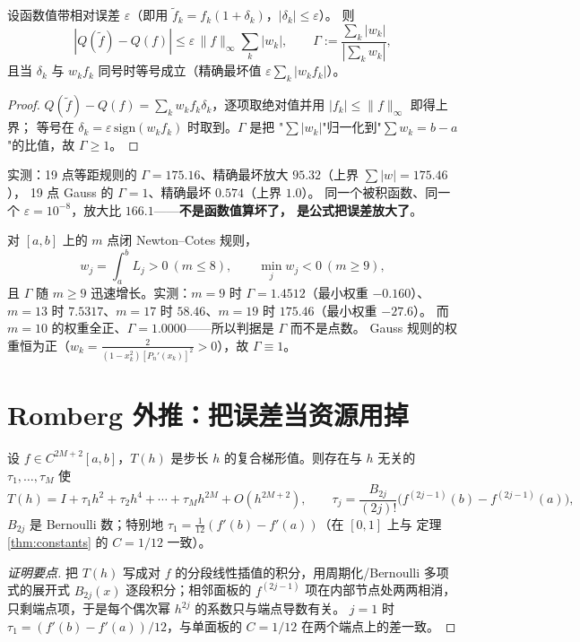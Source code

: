 \begin{theorem}
\label{thm:cond}
设函数值带相对误差 $\varepsilon$（即用 $\tilde f_k=f_k(1+\delta_k)$，$|\delta_k|\le\varepsilon$）。
则
\[
  |Q(\tilde f)-Q(f)|\le\varepsilon\,\|f\|_\infty\sum_k|w_k|,
  \qquad
  \Gamma:=\frac{\sum_k|w_k|}{|\sum_kw_k|},
\]
且当 $\delta_k$ 与 $w_kf_k$ 同号时等号成立（精确最坏值 $\varepsilon\sum_k|w_kf_k|$）。
\end{theorem}

\begin{proof}
$Q(\tilde f)-Q(f)=\sum_kw_kf_k\delta_k$，逐项取绝对值并用 $|f_k|\le\|f\|_\infty$ 即得上界；
等号在 $\delta_k=\varepsilon\,\mathrm{sign}(w_kf_k)$ 时取到。$\Gamma$ 是把
"$\sum|w_k|$"归一化到"$\sum w_k=b-a$"的比值，故 $\Gamma\ge1$。
\end{proof}

实测：19 点等距规则的 $\Gamma=175.16$、精确最坏放大 $95.32$（上界 $\sum|w|=175.46$），
19 点 Gauss 的 $\Gamma=1$、精确最坏 $0.574$（上界 $1.0$）。
同一个被积函数、同一个 $\varepsilon=10^{-8}$，放大比 $166.1$——\textbf{不是函数值算坏了，
是公式把误差放大了}。

\begin{corollary}[负权重]
对 $[a,b]$ 上的 $m$ 点闭 Newton–Cotes 规则，
\[
  w_j=\int_a^bL_j>0\ (m\le8),\qquad \min_jw_j<0\ (m\ge9),
\]
且 $\Gamma$ 随 $m\ge9$ 迅速增长。实测：$m=9$ 时 $\Gamma=1.4512$（最小权重 $-0.160$）、
$m=13$ 时 $7.5317$、$m=17$ 时 $58.46$、$m=19$ 时 $175.46$（最小权重 $-27.6$）。
而 $m=10$ 的权重全正、$\Gamma=1.0000$——所以判据是 $\Gamma$ 而不是点数。
Gauss 规则的权重恒为正（$w_k=\frac{2}{(1-x_k^2)[P_n'(x_k)]^2}>0$），故 $\Gamma\equiv1$。
\end{corollary}

\section{Romberg 外推：把误差当资源用掉}

\begin{theorem}
\label{thm:em}
设 $f\in C^{2M+2}[a,b]$，$T(h)$ 是步长 $h$ 的复合梯形值。则存在与 $h$ 无关的
$\tau_1,\dots,\tau_M$ 使
\[
  T(h)=I+\tau_1h^2+\tau_2h^4+\cdots+\tau_Mh^{2M}+O(h^{2M+2}),
  \qquad \tau_j=\frac{B_{2j}}{(2j)!}\bigl(f^{(2j-1)}(b)-f^{(2j-1)}(a)\bigr),
\]
$B_{2j}$ 是 Bernoulli 数；特别地 $\tau_1=\frac1{12}(f'(b)-f'(a))$（在 $[0,1]$ 上与
定理 \ref{thm:constants} 的 $C=1/12$ 一致）。
\end{theorem}

\begin{proof}[证明要点]
把 $T(h)$ 写成对 $f$ 的分段线性插值的积分，用周期化/Bernoulli 多项式的展开式
$B_{2j}(x)$ 逐段积分；相邻面板的 $f^{(2j-1)}$ 项在内部节点处两两相消，
只剩端点项，于是每个偶次幂 $h^{2j}$ 的系数只与端点导数有关。
$j=1$ 时 $\tau_1=(f'(b)-f'(a))/12$，与单面板的 $C=1/12$ 在两个端点上的差一致。
\end{proof}

